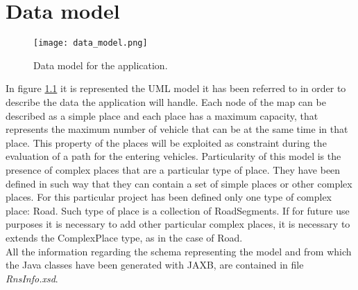 \chapter{Data model}\label{Chap:DataModel}
\begin{figure}[!htb]
   \centering
   \texttt{[image: data\_model.png]}
   \caption{Data model for the application.}\label{Fig:ArchNoImpl}
\end{figure}
In figure \ref{Fig:ArchNoImpl} it is represented the UML model it has been referred to in order to describe the data the application will handle. Each node of the map can be described as a simple place and each place has a maximum capacity, that represents the maximum number of vehicle that can be at the same time in that place. This property of the places will be exploited as constraint during the evaluation of a path for the entering vehicles. Particularity of this model is the presence of complex places that are a particular type of place. They have been defined in such way that they can contain a set of simple places or other complex places. For this particular project has been defined only one type of complex place: Road. Such type of place is a collection of RoadSegments. If for future use purposes it is necessary to add other particular complex places, it is necessary to extends the ComplexPlace type, as in the case of Road.\\
All the information regarding the schema representing the model and from which the Java classes have been generated with JAXB, are contained in file \textit{RnsInfo.xsd}.
